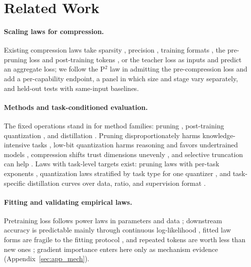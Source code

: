 \section{Related Work}
\label{sec:related}

\paragraph{Scaling laws for compression.} Existing compression laws
take sparsity \citep{frantar2023scaling}, precision
\citep{kumar2024scaling}, training formats \citep{panferov2025unified},
the pre-pruning loss and post-training tokens \citep{zhang2024scaling},
or the teacher loss \citep{busbridge2025distillation} as inputs and
predict an aggregate loss; we follow the P$^2$ law in admitting the
pre-compression loss and add a per-capability endpoint, a panel in which size and stage vary separately, and held-out tests with same-input baselines.

\paragraph{Methods and task-conditioned evaluation.}
The fixed operations stand in for method families: pruning
\citep{lecun1989optimal,hassibi1992second,han2015deep,frankle2019lottery,frantar2023sparsegpt,sun2023simple,ma2023llmpruner,ashkboos2024slicegpt,men2024shortgpt},
post-training quantization
\citep{dettmers2022llmint8,frantar2022gptq,xiao2022smoothquant,lin2023awq,chee2023quip,dettmers2023spqr,shao2023omniquant,dettmers2023qlora},
and distillation
\citep{hinton2015distilling,sanh2019distilbert,hsieh2023distilling,mukherjee2023orca,gu2023minillm,agarwal2023gkd,xu2024survey}.
Pruning disproportionately harms knowledge-intensive tasks
\citep{jaiswal2023compressing}, low-bit quantization harms reasoning
\citep{liu2025quantization} and favors undertrained models
\citep{ouyang2024lowbit}, compression shifts trust dimensions unevenly
\citep{hong2024decoding}, and selective truncation can help
\citep{sharma2023laser}. Laws with task-level targets exist: pruning laws with per-task exponents \citep{sengupta2025compression}, quantization laws stratified by task type for one quantizer \citep{zhou2025task}, and task-specific distillation curves over data, ratio, and supervision format \citep{ghita2026task}.

\paragraph{Fitting and validating empirical laws.} Pretraining loss
follows power laws in parameters and data
\citep{hestness2017deep,kaplan2020scaling,hoffmann2022training};
downstream accuracy is predictable mainly through continuous log-likelihood
\citep{wei2022emergent,schaeffer2023emergent,schaeffer2024predicting,gadre2024language,isik2024scaling,bhagia2024establishing,lourie2025scaling},
fitted law forms are fragile to the fitting protocol
\citep{li2025misfitting,besiroglu2024chinchilla}, and repeated tokens
are worth less than new ones \citep{muennighoff2023scaling}; gradient
importance \citep{lecun1989optimal,frantar2023sparsegpt,sun2023simple}
enters here only as mechanism evidence (Appendix~\ref{sec:app_mech}).
